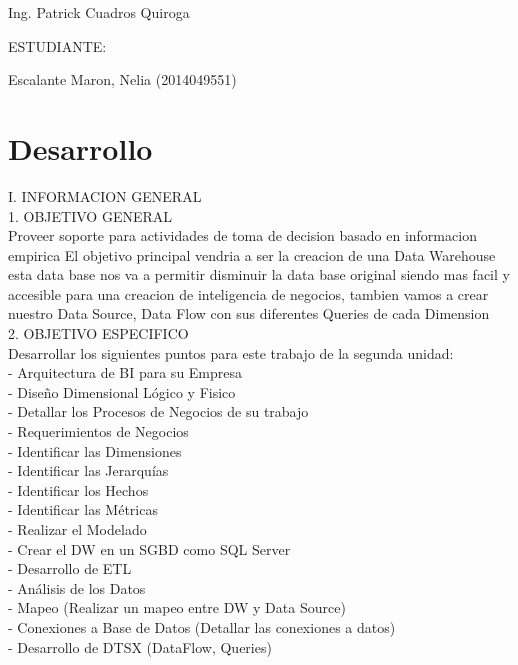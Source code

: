 \documentclass[12pt,letterpaper]{article}
\begin{document}
\begin{titlepage}
\begin{center}
\vspace*{0.1in}
\begin{large}
 Ing. Patrick Cuadros Quiroga\\
\end{large}

\vspace*{0.2in}
\vspace*{0.1in}
\begin{large}
ESTUDIANTE: \\
\begin{flushleft}
Escalante Maron, Nelia 		\hfill	(2014049551) \\

\end{flushleft}
\end{large}
\end{center}

\end{titlepage}


 \tableofcontents
 \newpage

 
\section{Desarrollo} 
I.	INFORMACION GENERAL\\

1.	OBJETIVO GENERAL\\
Proveer soporte para actividades de toma de decision basado en informacion empirica El objetivo principal vendria a ser la creacion de una Data Warehouse esta data base nos va a permitir disminuir la data base original siendo mas facil y accesible para una creacion de inteligencia de negocios, tambien vamos a crear nuestro Data Source, Data Flow con sus diferentes Queries de cada Dimension\\

2.	OBJETIVO ESPECIFICO\\
Desarrollar los siguientes puntos para este trabajo de la segunda unidad:\\

- Arquitectura de BI para su Empresa\\
- Dise\~no Dimensional L\'ogico y Fisico\\
- Detallar los Procesos de Negocios de su trabajo\\
- Requerimientos de Negocios\\
- Identificar las Dimensiones\\
- Identificar las Jerarqu\'ias\\
- Identificar los Hechos\\
- Identificar las M\'etricas\\
- Realizar el Modelado\\
- Crear el DW en un SGBD como SQL Server\\
- Desarrollo de ETL\\
- An\'alisis de los Datos\\
- Mapeo (Realizar un mapeo entre DW y Data Source)\\
- Conexiones a Base de Datos (Detallar las conexiones a datos)\\
- Desarrollo de DTSX (DataFlow, Queries)\\
\end{document}
